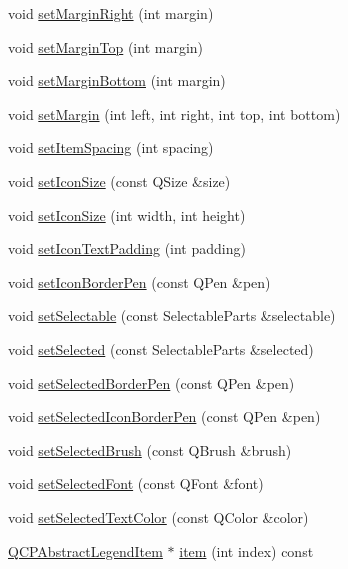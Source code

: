 \begin{DoxyCompactItemize}
\item 
void \hyperlink{classQCPLegend_a6da7cc21b66f427b7cebe2c180541f4b}{set\-Margin\-Right} (int margin)
\item 
void \hyperlink{classQCPLegend_a264f28f7983dbc9e3a063001eebfff2d}{set\-Margin\-Top} (int margin)
\item 
void \hyperlink{classQCPLegend_a1b8f2a9d47982cd8d7a126be026b831a}{set\-Margin\-Bottom} (int margin)
\item 
void \hyperlink{classQCPLegend_afa9e9681dbe3fa05302353a78cb34588}{set\-Margin} (int left, int right, int top, int bottom)
\item 
void \hyperlink{classQCPLegend_a1bb966ee2b5f05b9d7e4866d2b1114c0}{set\-Item\-Spacing} (int spacing)
\item 
void \hyperlink{classQCPLegend_a8b0740cce488bf7010da6beda6898984}{set\-Icon\-Size} (const Q\-Size \&size)
\item 
void \hyperlink{classQCPLegend_a96b1a37fd4ee6a9778e6e54fe56ab6c2}{set\-Icon\-Size} (int width, int height)
\item 
void \hyperlink{classQCPLegend_a62973bd69d5155e8ea3141366e8968f6}{set\-Icon\-Text\-Padding} (int padding)
\item 
void \hyperlink{classQCPLegend_a2f2c93d18a651f4ff294bb3f026f49b8}{set\-Icon\-Border\-Pen} (const Q\-Pen \&pen)
\item 
void \hyperlink{classQCPLegend_aae042f6211e39305d13f7b18c1c301d9}{set\-Selectable} (const Selectable\-Parts \&selectable)
\item 
void \hyperlink{classQCPLegend_a752c48b30f8ba870b55e79659385f107}{set\-Selected} (const Selectable\-Parts \&selected)
\item 
void \hyperlink{classQCPLegend_a2c35d262953a25d96b6112653fbefc88}{set\-Selected\-Border\-Pen} (const Q\-Pen \&pen)
\item 
void \hyperlink{classQCPLegend_ade93aabe9bcccaf9cf46cec22c658027}{set\-Selected\-Icon\-Border\-Pen} (const Q\-Pen \&pen)
\item 
void \hyperlink{classQCPLegend_a875227f3219c9799464631dec5e8f1bd}{set\-Selected\-Brush} (const Q\-Brush \&brush)
\item 
void \hyperlink{classQCPLegend_ab580a01c3c0a239374ed66c29edf5ad2}{set\-Selected\-Font} (const Q\-Font \&font)
\item 
void \hyperlink{classQCPLegend_a7674dfc7a1f30e1abd1018c0ed45e0bc}{set\-Selected\-Text\-Color} (const Q\-Color \&color)
\item 
\hyperlink{classQCPAbstractLegendItem}{Q\-C\-P\-Abstract\-Legend\-Item} $\ast$ \hyperlink{classQCPLegend_a454272d7094437beb3278a2294006da5}{item} (int index) const 

\end{DoxyCompactItemize}
